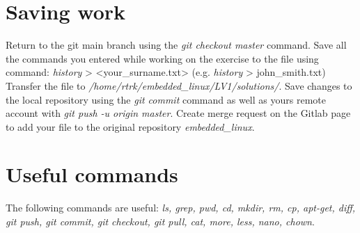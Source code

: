 \documentclass[11pt]{article}
\begin{document}
\section{Saving work}
Return to the git main branch using the \textit{git checkout master} command.
 Save all the commands you entered while working on the exercise to the file
 using command:
\newline
\newline
\textit{history} > <your\_surname.txt> (e.g. \textit{history} > john\_smith.txt)
\newline
\newline
Transfer the file to \textit{/home/rtrk/embedded\_linux/LV1/solutions/}. Save
 changes to the local repository using the \textit{git commit} command as well
 as yours remote account with \textit{git push -u origin master}. Create merge
 request on the Gitlab page to add your file to the original repository
 \textit{embedded\_linux}.
\section{Useful commands}
The following commands are useful: \textit{ls, grep, pwd, cd, mkdir, rm, cp,
 apt-get, diff, git push, git commit, git checkout, git pull, cat, more, less,
 nano, chown}.
\end{document}
